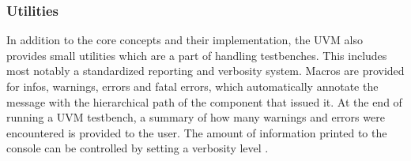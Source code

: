 \documentclass[11pt,a4paper]{report}
\begin{document}

\subsubsection{Utilities} %

In addition to the core concepts and their implementation, the UVM also provides small utilities which are a part of
handling testbenches. This includes most notably a standardized reporting and verbosity system. Macros are provided
for infos, warnings, errors and fatal errors, which automatically annotate the message with the hierarchical path of
the component that issued it. At the end of running a UVM testbench, a summary of how many warnings and errors were
encountered is
provided to the user. The amount of information printed to the console can be controlled by setting a verbosity level
\cite[Ch. 19]{salemi2013uvm}.
\end{document}
